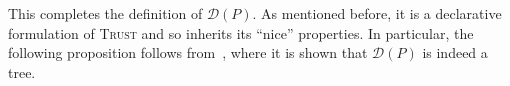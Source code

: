 \documentclass[acmsmall]{acmart}
\def\set#1{{\{ #1 \}}}
\def\tuple#1{{\langle #1\rangle}}
\newcommand{\trust}{\textsc{Trust}\xspace}
\newcommand{\opw}{\mathsf{W}}
\newcommand{\opr}{\mathsf{R}}
\newcommand{\op}{\mathsf{op}}
\newcommand{\loc}{\mathsf{loc}}
\newcommand{\init}{\mathsf{init}}
\newcommand{\nextop}{\mathsf{next}}
\newcommand{\visit}{\mathsf{visit}}
\newcommand{\setmo}{\mathsf{setMo}}
\newcommand{\mo}[1]{{\textcolor{orange}{\mathsf{mo}}_{#1}}}
\newcommand{\porf}[1]{\textcolor{darkgray}{\mathsf{po}\textcolor{green!60!black}{\mathsf{rf}}}_{#1}}
\newcommand{\seqcon}[1]{{\textcolor{blue}{\mathsf{sc}}_{#1}}}
\newcommand{\inord}{\textcolor{purple}\leq}
\newcommand{\mstep}[1][]{\ifthenelse{\equal{#1}{}}{\rightsquigarrow}{\overset{#1}{\rightsquigarrow}}}
\newcommand{\fwdtikz}{%
  \tikz[baseline=(char.base)]{
    \node[shape=circle, draw, fill=lime!50, inner sep=0.15pt] (char) {$\looparrowright$};
  }
}
\newcommand{\bwdtikz}{%
  \tikz[baseline=(char.base)]{
    \node[shape=circle, draw, fill=red!30, inner sep=0.15pt] (char) {$\looparrowleft$};
  }
}
\begin{document}
This completes the definition of $\mathcal{D}(P)$. As mentioned before, it is a declarative formulation of \trust and so inherits its ``nice'' properties. In particular, the following proposition follows from~\cite{trust}, where it is shown that $\mathcal{D}(P)$ is indeed a tree.






\end{document}
